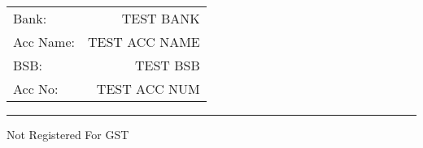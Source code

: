 \documentclass[11pt]{letter}
\begin{document}
\vspace{5cm}



\begin{tabularx}{\textwidth}{>{\raggedleft\arraybackslash}p{} r}
Bank: & 
TEST BANK 
\\
Acc Name: & 
TEST ACC NAME
\\
BSB: & 
TEST BSB
 \\
Acc No: & 
TEST ACC NUM
 \\
\end{tabularx}

\vfill

\textcolor{black}{\rule{\textwidth}{1pt}}
Not Registered For GST
\end{document}
